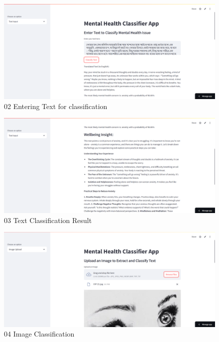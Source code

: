 \begin{figure}[h!]  
    \centering
    \includegraphics[width=1.0\textwidth]{App Images/02 Interface.png}  
    \caption{02 Entering Text for classification}
    \label{02i}  %
\end{figure}

\begin{figure}[h!]  
    \centering
    \includegraphics[width=1.0\textwidth]{App Images/03 Interface.png}  
    \caption{03 Text Classification Result}
    \label{03i}  %
\end{figure}

\begin{figure}[h!]  
    \centering
    \includegraphics[width=1.0\textwidth]{App Images/04 Interface.png}  
    \caption{04 Image Classification}
    \label{04i}  %
\end{figure}

